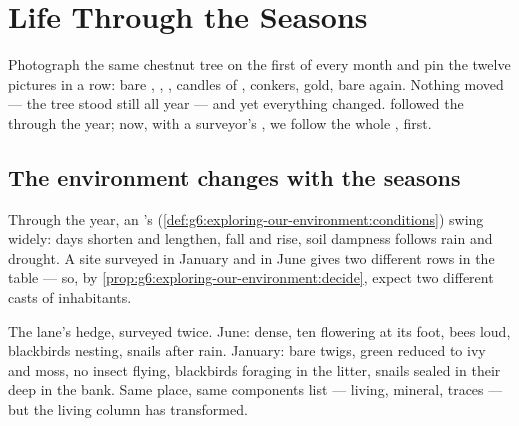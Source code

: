 \chapter{Life Through the Seasons}\label{ch:g6:life-through-seasons}

Photograph the same chestnut tree on the first of every month
and pin the twelve pictures in a row: bare , ,
, candles of , conkers, gold, bare 
again. Nothing moved --- the tree stood still all year ---
and yet everything changed. 
followed the  through the year; now, with a surveyor's
, we follow the whole ,  first.

\section{The environment changes with the seasons}

\begin{proposition}\label{prop:g6:life-through-seasons:conditions}
Through the year, an 's 
(\cref{def:g6:exploring-our-environment:conditions}) swing
widely: days shorten and lengthen,  fall and
rise, soil dampness follows rain and drought. A site
surveyed in January and in June gives two different rows in
the table --- so, by
\cref{prop:g6:exploring-our-environment:decide}, expect two
different casts of inhabitants.
\end{proposition}
\admitted

\begin{example}\label{ex:g6:life-through-seasons:hedge}
The lane's hedge, surveyed twice. June:  dense, ten
  flowering at its foot, bees loud, blackbirds
nesting, snails after rain. January: bare twigs, green
reduced to ivy and moss, no insect flying, blackbirds
foraging in the  litter, snails sealed in their 
deep in the bank. Same place, same components list ---
living, mineral, traces --- but the living column has
transformed.
\end{example}

